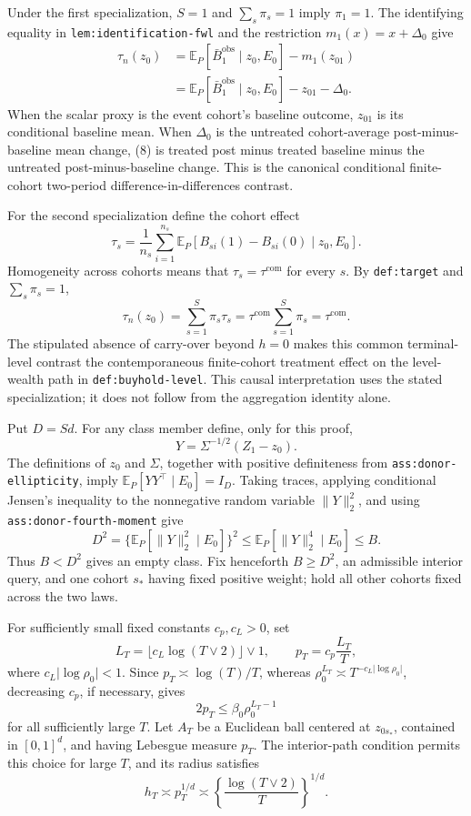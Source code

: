 Under the first specialization, \(S=1\) and \(\sum_s\pi_s=1\) imply
\(\pi_1=1\).  The identifying equality in
\texttt{lem:identification-fwl} and the restriction
\(m_1(x)=x+\Delta_0\) give
\[
\begin{aligned}
\tau_n(z_0)
&=\mathbb E_P[\bar B_1^{\mathrm{obs}}\mid z_0,E_0]-m_1(z_{01})\\
&=\mathbb E_P[\bar B_1^{\mathrm{obs}}\mid z_0,E_0]-z_{01}-\Delta_0.
\end{aligned}
\tag{8}
\]
When the scalar proxy is the event cohort's baseline outcome, \(z_{01}\) is
its conditional baseline mean.  When \(\Delta_0\) is the untreated
cohort-average post-minus-baseline mean change, (8) is treated post minus
treated baseline minus the untreated post-minus-baseline change.  This is the
canonical conditional finite-cohort two-period difference-in-differences
contrast.

For the second specialization define the cohort effect
\[
\tau_s=\frac1{n_s}\sum_{i=1}^{n_s}
\mathbb E_P[B_{si}(1)-B_{si}(0)\mid z_0,E_0].
\]
Homogeneity across cohorts means that \(\tau_s=\tau^{\mathrm{com}}\) for every
\(s\).  By \texttt{def:target} and \(\sum_s\pi_s=1\),
\[
\tau_n(z_0)=\sum_{s=1}^{S}\pi_s\tau_s
=\tau^{\mathrm{com}}\sum_{s=1}^{S}\pi_s
=\tau^{\mathrm{com}}.
\tag{9}
\]
The stipulated absence of carry-over beyond \(h=0\) makes this common
terminal-level contrast the contemporaneous finite-cohort treatment effect on
the level-wealth path in \texttt{def:buyhold-level}.  This causal
interpretation uses the stated specialization; it does not follow from the
aggregation identity alone.

Put \(D=Sd\).  For any class member define, only for this proof,
\[
Y=\Sigma^{-1/2}(Z_1-z_0).
\]
The definitions of \(z_0\) and \(\Sigma\), together with positive
definiteness from \texttt{ass:donor-ellipticity}, imply
\(\mathbb E_P[YY^\top\mid E_0]=I_D\).  Taking traces, applying conditional
Jensen's inequality to the nonnegative random variable \(\lVert Y\rVert_2^2\),
and using \texttt{ass:donor-fourth-moment} give
\[
D^2
=\{\mathbb E_P[\lVert Y\rVert_2^2\mid E_0]\}^2
\le \mathbb E_P[\lVert Y\rVert_2^4\mid E_0]
\le B.
\tag{10}
\]
Thus \(B<D^2\) gives an empty class.  Fix henceforth \(B\ge D^2\), an
admissible interior query, and one cohort \(s_*\) having fixed positive
weight; hold all other cohorts fixed across the two laws.

For sufficiently small fixed constants \(c_p,c_L>0\), set
\[
L_T=\lfloor c_L\log(T\vee2)\rfloor\vee1,
\qquad
p_T=c_p\frac{L_T}{T},
\]
where \(c_L\lvert\log\rho_0\rvert<1\).  Since
\(p_T\asymp \log(T)/T\), whereas
\(\rho_0^{L_T}\asymp T^{-c_L\lvert\log\rho_0\rvert}\), decreasing
\(c_p\), if necessary, gives
\[
2p_T\le \beta_0\rho_0^{L_T-1}
\tag{11}
\]
for all sufficiently large \(T\).  Let \(A_T\) be a Euclidean ball centered
at \(z_{0s_*}\), contained in \([0,1]^d\), and having Lebesgue measure
\(p_T\).  The interior-path condition permits this choice for large \(T\),
and its radius satisfies
\[
h_T\asymp p_T^{1/d}
\asymp\left\{\frac{\log(T\vee2)}{T}\right\}^{1/d}.
\tag{12}
\]

